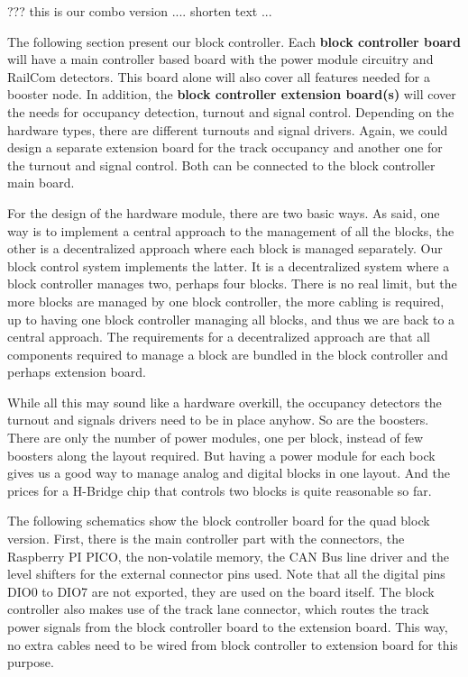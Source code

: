 
??? this is our combo version .... shorten text ...

The following section present our block controller. Each \textbf{block controller board} will have a main controller based board with the power module circuitry and RailCom detectors. This board alone will also cover all features needed for a booster node. In addition, the\textbf{ block controller extension board(s)} will cover the needs for occupancy detection, turnout and signal control. Depending on the hardware types, there are different turnouts and signal drivers. Again, we could design a separate extension board for the track occupancy and another one for the turnout and signal control. Both can be connected to the block controller main board.

For the design of the hardware module, there are two basic ways. As said, one way is to implement a central approach to the management of all the blocks, the other is a decentralized approach where each block is managed separately. Our block control system implements the latter. It is a decentralized system where a block controller manages two, perhaps four blocks. There is no real limit, but the more blocks are managed by one block controller, the more cabling is required, up to having one block controller managing all blocks, and thus we are back to a central approach. The requirements for a decentralized approach are that all components required to manage a block are bundled in the block controller and perhaps extension board.


While all this may sound like a hardware overkill, the occupancy detectors the turnout and signals drivers need to be in place anyhow. So are the boosters. There are only the number of power modules, one per block, instead of few boosters along the layout required. But having a power module for each bock gives us a good way to manage analog and digital blocks in one layout. And the prices for a H-Bridge chip that controls two blocks is quite reasonable so far.



The following schematics show the block controller board for the quad block version. First, there is the main controller part with the connectors, the Raspberry PI PICO, the non-volatile memory, the CAN Bus line driver and the level shifters for the external connector pins used. Note that all the digital pins DIO0 to DIO7 are not exported, they are used on the board itself. The block controller also makes use of the track lane connector, which routes the track power signals from the block controller board to the extension board. This way, no extra cables need to be wired from block controller to extension board for this purpose. 

